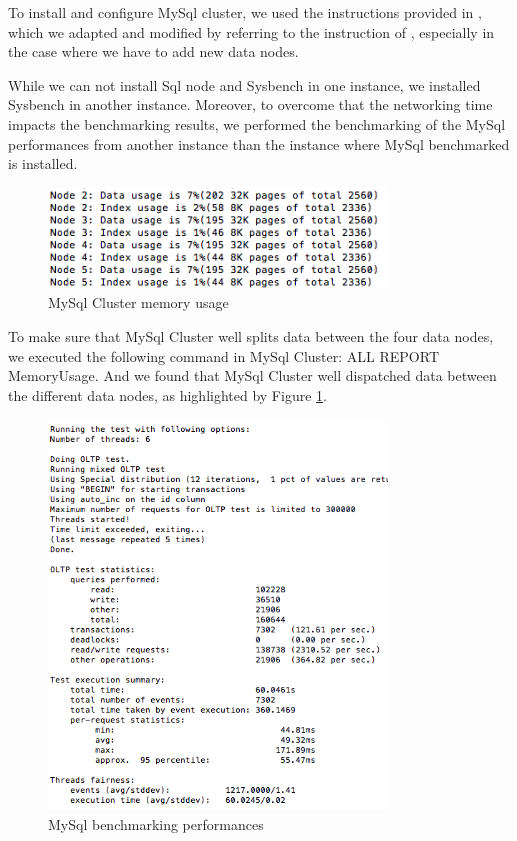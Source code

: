 \documentclass[10pt, conference]{IEEEtran}
\begin{document}
To install and configure MySql cluster, we used the instructions provided in \cite{MySQLCluster}, which we adapted and modified by referring to the instruction of \cite{MySQLCluster2}, especially in the case where we have to add new data nodes. 

While we can not install Sql node and Sysbench in one instance, we installed Sysbench in another instance. Moreover, to overcome that the networking time impacts the benchmarking results, we performed the benchmarking of the MySql performances from another instance than the instance where MySql benchmarked is installed.

\begin{figure}[h!]
	\centering
	\includegraphics[width=9cm]{MemoryUsage.png}
	\caption{MySql Cluster memory usage}
	\label{fig:MemoryUsage}
\end{figure} 

To make sure that MySql Cluster well splits data between the four data nodes, we executed the following command in MySql Cluster: ALL REPORT MemoryUsage. And we found that MySql Cluster well dispatched data between the different data nodes, as highlighted by Figure \ref{fig:MemoryUsage}.

\begin{figure}[h!]
	\centering
	\includegraphics[width=9cm]{results1.png}
	\caption{MySql benchmarking performances}
	\label{fig:results1}
\end{figure} 
\end{document}
